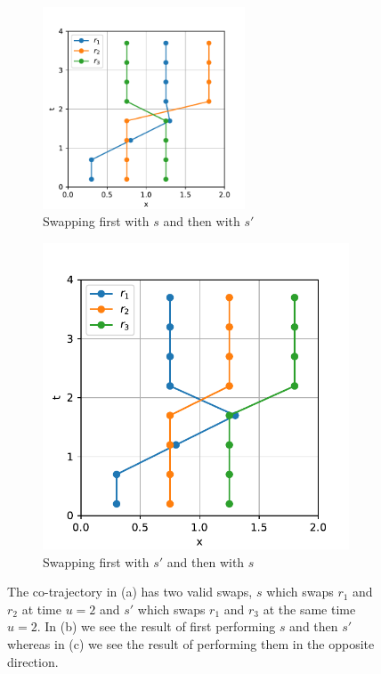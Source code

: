 \documentclass[12pt]{article}
\newcommand{\traj}{r}
\newcommand{\swap}{s}
\newcommand{\swaptime}{u}
\theoremstyle{definition}
\begin{document}
\begin{figure}
    \begin{subfigure}[t]{0.45\textwidth}
      \includegraphics[width=6cm]{swap-order-counter-example-b.pdf}
      \caption{Swapping first with \(\swap\) and then with \(\swap'\)}
      \label{fig:swap-order-counter-example-b}
    \end{subfigure}
    \begin{subfigure}[t]{0.45\textwidth}
      \includegraphics[width=\textwidth]{swap-order-counter-example-c.pdf}
      \caption{Swapping first with \(\swap'\) and then with \(\swap\)}
      \label{fig:swap-order-counter-example-c}
    \end{subfigure}
    \caption{The co-trajectory in (a) has two valid swaps, \(\swap\)
      which swaps \(\traj_{1}\) and \(\traj_{2}\) at time
      \(\swaptime = 2\) and \(\swap'\) which swaps \(\traj_{1}\) and
      \(\traj_{3}\) at the same time \(\swaptime = 2\). In (b) we see
      the result of first performing \(\swap\) and then \(\swap'\)
      whereas in (c) we see the result of performing them in the
      opposite direction.}
    \label{fig:swap-order-counter-example}
\end{figure}
\end{document}
